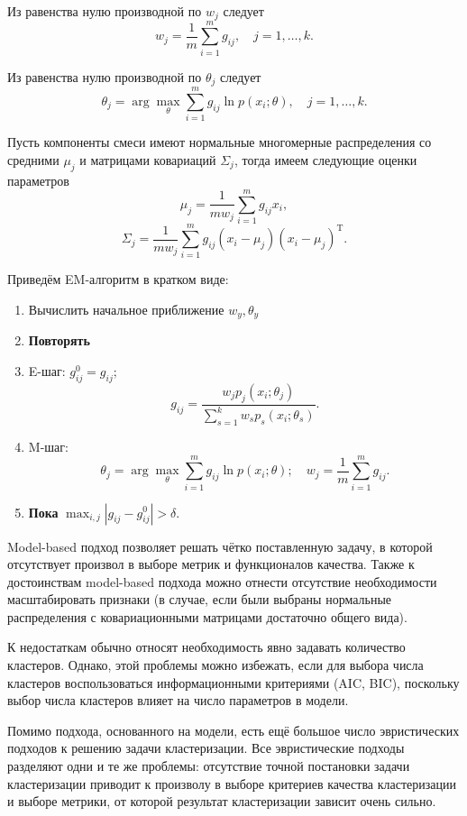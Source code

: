 \documentclass[10pt]{article}
\begin{document}
Из равенства нулю производной по $w_j$ следует $$w_j = \frac{1}{m} \sum_{i=1}^m g_{ij}, \quad j=1, \dots, k.$$

Из равенства нулю производной по $\theta_j$ следует $$\theta_j = \arg \max_\theta \sum_{i=1}^m g_{ij} \ln p(x_i; \theta), \quad j=1, \dots, k.$$

Пусть компоненты смеси имеют нормальные многомерные распределения со средними $\mu_j$ и матрицами ковариаций $\Sigma_j$, тогда 
имеем следующие оценки параметров
	$$\mu_j = \frac{1}{mw_j} \sum_{i=1}^m g_{ij} x_i,$$
	$$\Sigma_j = \frac{1}{mw_j} \sum_{i=1}^m g_{ij} (x_i - \mu_j) (x_i - \mu_j)^{\mathrm{T}}.$$


Приведём EM-алгоритм в кратком виде:
	\begin{enumerate}
		\item Вычислить начальное приближение $w_y, \theta_y$
		\item \textbf{Повторять}
		\item \quad E-шаг: $g_{ij}^0 = g_{ij};$ $$g_{ij} = \frac{w_j p_j(x_i; \theta_j)}{\sum_{s=1}^k w_{s} p_{s}(x_i; \theta_s) }.$$
		\item \quad M-шаг: $$\theta_j = \arg \max_\theta \sum_{i=1}^m g_{ij} \ln p(x_i; \theta); \quad w_j = \frac{1}{m} \sum_{i=1}^m g_{ij}.$$
		\item \textbf{Пока} $\max_{i,j} |g_{ij} - g_{ij}^0| > \delta$.
	\end{enumerate}

Model-based подход позволяет решать чётко поставленную задачу, в которой отсутствует произвол в выборе метрик и функционалов качества.
Также к достоинствам model-based подхода можно отнести отсутствие необходимости масштабировать признаки (в случае, если были выбраны нормальные распределения 
с ковариационными матрицами достаточно общего вида).

К недостаткам обычно относят необходимость явно задавать количество кластеров. Однако, этой проблемы можно избежать, если для выбора
числа кластеров воспользоваться информационными критериями (AIC, BIC), поскольку выбор числа кластеров влияет на число параметров в модели.

Помимо подхода, основанного на модели, есть ещё большое число эвристических подходов к решению задачи кластеризации. 
Все эвристические подходы разделяют одни и те же проблемы: отсутствие точной постановки задачи кластеризации приводит к произволу в выборе критериев
качества кластеризации и выборе метрики, от которой результат кластеризации зависит очень сильно.
\end{document}

